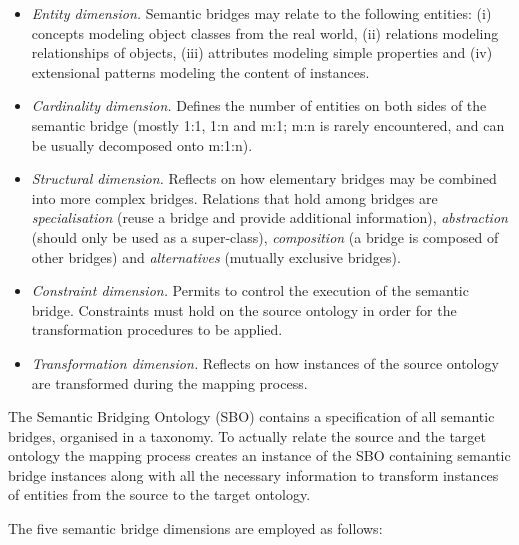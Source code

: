 \documentclass{fast_latex}
\begin{document}
\begin{itemize}
\item \textit{Entity dimension.} Semantic bridges may relate to the
following entities: (i) concepts modeling object classes from the real
world, (ii) relations modeling relationships of objects, (iii)
attributes modeling simple properties and (iv) extensional patterns
modeling the content of instances. 
\item \textit{Cardinality dimension.} Defines the number of entities on
both sides of the semantic bridge (mostly 1:1, 1:n and m:1; m:n is
rarely encountered, and can be usually decomposed onto m:1:n). 
\item \textit{Structural dimension.} Reflects on how elementary bridges
may be combined into more complex bridges. Relations that hold among
bridges are \textit{specialisation} (reuse a bridge and provide
additional information), \textit{abstraction} (should only be used as a
super-class), \textit{composition} (a bridge is composed of other
bridges) and \textit{alternatives} (mutually exclusive bridges). 
\item \textit{Constraint dimension.} Permits to control the execution of
the semantic bridge. Constraints must hold on the source ontology in
order for the transformation procedures to be applied. 
\item \textit{Transformation dimension.} Reflects on how instances of
the source ontology are transformed during the mapping process. 
\end{itemize}
The Semantic Bridging Ontology (SBO) contains a specification of all
semantic bridges, organised in a taxonomy. To actually relate the
source and the target ontology the mapping process creates an instance
of the SBO containing semantic bridge instances along with all the
necessary information to transform instances of entities from the
source to the target ontology. 

The five semantic bridge dimensions are employed as follows: 
\end{document}
